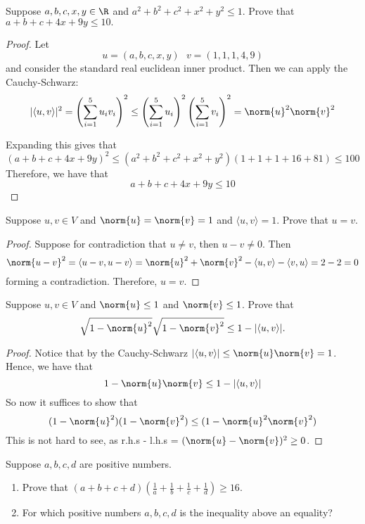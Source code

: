 \documentclass{extarticle}
\begin{document}
\begin{problem}{8}
    Suppose \(a,b,c,x,y \in \R\) and \(a^2 + b^2 + c^2 + x^2 + y^2 \leq 1\). Prove that
    \(a + b + c + 4x + 9y \leq 10.\)
\end{problem}

\begin{proof}
Let
\[u = (a, b, c, x, y) \ \ \ v = (1, 1, 1, 4, 9)\]
and consider the standard real euclidean inner product. Then we can apply the Cauchy-Schwarz:
\[|\langle u,v \rangle|^2 = \left(\sum_{i=1}^{5}u_i v_i \right)^2 \leq \left(\sum_{i=1}^{5} u_i\right)^2 \left(\sum_{i=1}^{5}v_i\right)^2 = \norm{u}^2 \norm{v}^2\]

Expanding this gives that
\[(a + b + c + 4x + 9y)^2 \leq (a^2+b^2+c^2+x^2+y^2)(1+1+1+16+81) \leq 100\]
Therefore, we have that
\[a + b + c + 4x + 9y \leq 10\]
\end{proof}

\begin{problem}{9}
    Suppose \(u, v \in V\) and \(\norm{u} = \norm{v} = 1\) and \(\langle u,v \rangle = 1\). Prove
    that \(u = v\).
\end{problem}

\begin{proof}
Suppose for contradiction that \(u \neq v\), then \(u - v \neq 0\). Then
\[\norm{u - v}^2 = \langle u-v,u-v \rangle = \norm{u}^2 + \norm{v}^2 - \langle u,v \rangle
- \langle v,u \rangle= 2 - 2 = 0\]
forming a contradiction. Therefore, \(u = v\).
\end{proof}

\begin{problem}{10}
    Suppose \(u, v \in V\) and \(\norm{u} \leq 1\) and \(\norm{v} \leq 1\). Prove that
    \[\sqrt{1 - \norm{u}^2} \sqrt{1 - \norm{v}^2} \leq 1 - |\langle u,v \rangle|.\]
\end{problem}

\begin{proof}
Notice that by the Cauchy-Schwarz \( |\langle u,v \rangle| \leq \norm{u}\norm{v} = 1\). Hence, we have that
\[1 - \norm{u} \norm{v} \leq 1 - |\langle u,v \rangle|\]
So now it suffices to show that
\[(1 - \norm{u}^2)(1 - \norm{v}^2) \leq (1 - \norm{u}^2 \norm{v}^2)\]
This is not hard to see, as r.h.s - l.h.s = \((\norm{u} - \norm{v})^2 \geq 0\).
\end{proof}

\begin{problem}{12}
    Suppose \(a,b,c,d\) are positive numbers.
    \begin{enumerate}[label=(\alph*)]
        \item Prove that \((a+b+c+d)(\frac{1}{a} + \frac{1}{b} + \frac{1}{c} + \frac{1}{d}) \geq 16\).
        \item For which positive numbers \(a,b,c,d\) is the inequality above an equality?
    \end{enumerate}
\end{problem}
\end{document}
